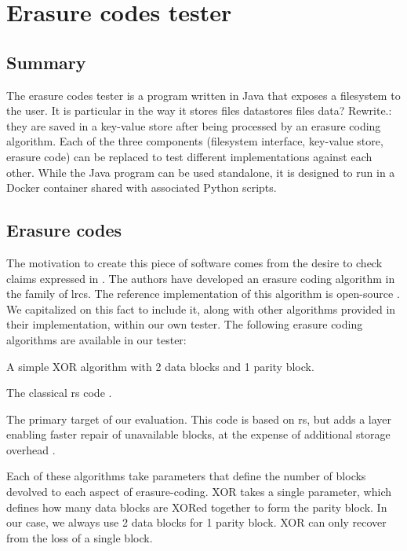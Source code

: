 \section{Erasure codes tester}

\subsection{Summary}

The erasure codes tester is a program written in Java that exposes a filesystem to the user.
It is particular in the way it stores files data{stores files data? Rewrite.}: they are saved in a key-value store after being processed by an erasure coding algorithm.
Each of the three components (filesystem interface, key-value store, erasure code) can be replaced to test different implementations against each other.
While the Java program can be used standalone, it is designed to run in a Docker container shared with associated Python scripts.

\subsection{Erasure codes}

The motivation to create this piece of software comes from the desire to check claims expressed in \cite{XorbasVLDB} \cite{XorbasVLDB}.
The authors have developed an erasure coding algorithm in the family of \acfp{lrc}.
The reference implementation of this algorithm is open-source \cite{xorbas-github}.
We capitalized on this fact to include it, along with other algorithms provided in their implementation, within our own tester.
The following erasure coding algorithms are available in our tester:
\begin{description}
\item[XOR] A simple XOR algorithm with 2 data blocks and 1 parity block.
\item[\acs{rs}] The classical \ac{rs} code \cite{reed-solomon}.
\item[\acs{lrc}] The primary target of our evaluation. This code is based on \ac{rs}, but adds a layer enabling faster repair of unavailable blocks, at the expense of additional storage overhead \cite{XorbasVLDB}.
\end{description}

Each of these algorithms take parameters that define the number of blocks devolved to each aspect of erasure-coding.
XOR takes a single parameter, which defines how many data blocks are XORed together to form the parity block.
In our case, we always use 2 data blocks for 1 parity block.
XOR can only recover from the loss of a single block.


